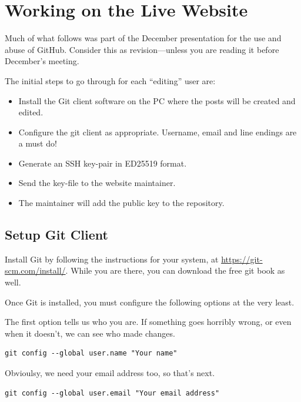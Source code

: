 \chapter{Working on the Live Website}\label{chap: Working on the Live Website}

Much of what follows was part of the December presentation for the use and abuse of GitHub. Consider this as revision---unless you are reading it before December's meeting.

The initial steps to go through for each ``editing'' user are:

\begin{itemize}
    \item Install the Git client software on the PC where the posts will be created and edited.
    \item Configure the git client as appropriate. Username, email and line endings are a must do!
    \item Generate an SSH key-pair in ED25519 format.
    \item Send the  key-file to the website maintainer.
    \item The maintainer will add the public key to the repository.
\end{itemize}

\section{Setup Git Client}

Install Git by following the instructions for your system, at \url{https://git-scm.com/install/}. While you are there, you can download the free git book as well.

Once Git is  installed, you must configure the following options at the very least.

The first option tells us who you are. If something goes horribly wrong, or even when it doesn't, we can see who made changes.

\begin{lstlisting}[style=myText]
git config --global user.name "Your name"
\end{lstlisting}

Obvioulsy, we need your email address too, so that's next.

\begin{lstlisting}[style=myText]
git config --global user.email "Your email address"
\end{lstlisting}

